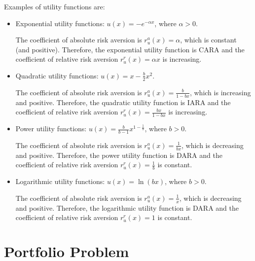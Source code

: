 \documentclass[twoside, titlepage]{article}
\begin{document}
Examples of utility functions are:
\begin{itemize}
    \item Exponential utility functions: $u(x) = -e^{-\alpha x}$, where $\alpha > 0$.
    \begin{explanation}
        The coefficient of absolute risk aversion is $r^a_u(x) = \alpha$, which is constant (and positive). Therefore, the exponential utility function is CARA and the coefficient of relative risk aversion $r^r_u(x) = \alpha x$ is increasing.
    \end{explanation}
    \item Quadratic utility functions: $u(x) = x - \frac{b}{2}x^2$.
    \begin{explanation}
        The coefficient of absolute risk aversion is $r^a_u(x) = \frac{b}{1 - bx}$, which is increasing and positive. Therefore, the quadratic utility function is IARA and the coefficient of relative risk aversion $r^r_u(x) = \frac{bx}{1 - bx}$ is increasing.
    \end{explanation}
    \item Power utility functions: $u(x) = \frac{b}{b-1}x^{1 - \frac{1}{b}}$, where $b > 0$.
    \begin{explanation}
        The coefficient of absolute risk aversion is $r^a_u(x) = \frac{1}{bx}$, which is decreasing and positive. Therefore, the power utility function is DARA and the coefficient of relative risk aversion $r^r_u(x) = \frac{1}{b}$ is constant.
    \end{explanation}
    \item Logarithmic utility functions: $u(x) = \ln(bx)$, where $b > 0$.
    \begin{explanation}
        The coefficient of absolute risk aversion is $r^a_u(x) = \frac{1}{x}$, which is decreasing and positive. Therefore, the logarithmic utility function is DARA and the coefficient of relative risk aversion $r^r_u(x) = 1$ is constant.
    \end{explanation}
\end{itemize}

\section{Portfolio Problem}
\end{document}
